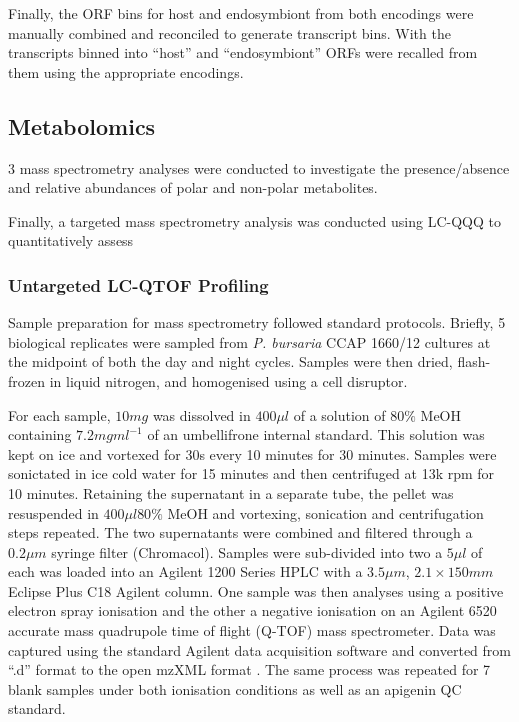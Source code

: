 Finally, the ORF bins for host and endosymbiont 
from both encodings were manually combined and reconciled
to generate transcript bins.  With the transcripts binned into
``host'' and ``endosymbiont'' ORFs were recalled from them using the appropriate
encodings. 




\subsection{Metabolomics}

3 mass spectrometry analyses were conducted to investigate the presence/absence
and relative abundances of polar and non-polar metabolites.

Finally, a targeted mass spectrometry analysis was conducted using
LC-QQQ to quantitatively assess 



\subsubsection{Untargeted LC-QTOF Profiling}

Sample preparation for mass spectrometry followed standard protocols.
Briefly, 5 biological replicates were sampled from \textit{P. bursaria} CCAP 1660/12 
cultures at the midpoint of both the day and night cycles. 
Samples were then dried, flash-frozen in liquid nitrogen, and homogenised
using a cell disruptor. 

For each sample, \(10mg\) was dissolved in \(400\mu l\)
of a solution of \(80\%\) MeOH containing \(7.2mg ml^{-1}\) of
an umbellifrone internal standard.  This solution was kept on ice
and vortexed for 30s every 10 minutes for 30 minutes.
Samples were sonictated in ice cold water for 15 minutes and then centrifuged
at 13k rpm for 10 minutes.  Retaining the supernatant in a separate tube, the pellet
was resuspended in \(400\mu l 80\%\) MeOH and vortexing, sonication and centrifugation
steps repeated.  The two supernatants were combined and filtered through 
a \(0.2\mu m\) syringe filter (Chromacol).  Samples were sub-divided into two 
a \(5\mu l\) of each was loaded into an Agilent 1200 Series HPLC with
a \(3.5\mu m\), \(2.1\times 150mm\) Eclipse Plus C18 Agilent column.
One sample was then analyses using a positive electron spray ionisation
and the other a negative ionisation on an Agilent 6520 accurate mass
quadrupole time of flight (Q-TOF) mass spectrometer. Data was captured
using the standard Agilent data acquisition software and converted
from ``.d'' format to the open mzXML format \citep{Pedrioli2004}.
The same process was repeated for 7 blank samples under both ionisation conditions
as well as an apigenin QC standard.

